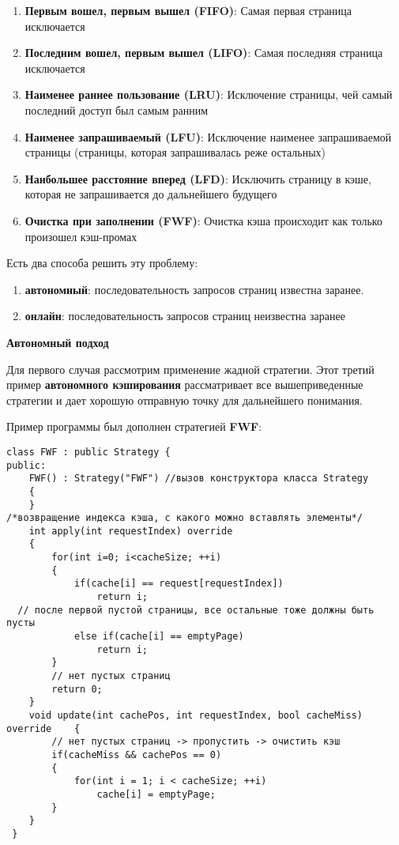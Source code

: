 \begin{enumerate}
    \item \textbf{Первым вошел, первым вышел (FIFO)}: Самая первая страница исключается
    \item \textbf{Последним вошел, первым вышел (LIFO)}: Самая последняя страница исключается
    \item \textbf{Наименее раннее пользование (LRU)}: Исключение страницы, чей самый последний доступ был самым ранним
    \item \textbf{Наименее запрашиваемый (LFU)}: Исключение наименее запрашиваемой страницы (страницы, которая запрашивалась реже остальных)
    \item \textbf{Наибольшее расстояние вперед (LFD)}: Исключить страницу в кэше, которая не запрашивается до дальнейшего будущего
    \item \textbf{Очистка при заполнении (FWF)}: Очистка кэша происходит как только произошел кэш-промах
\end{enumerate}

Есть два способа решить эту проблему:

\begin{enumerate}
    \item \textbf{автономный}: последовательность запросов страниц известна заранее.
    \item \textbf{онлайн}: последовательность запросов страниц неизвестна заранее
\end{enumerate}

\textbf{Автономный подход}

\vspace{\baselineskip}

Для первого случая рассмотрим применение жадной стратегии. Этот третий пример \textbf{автономного кэширования} рассматривает все вышеприведенные стратегии и дает хорошую отправную точку для дальнейшего понимания.

\vspace{\baselineskip}

Пример программы был дополнен стратегией \textbf{FWF}:

\begin{tcolorbox}
\begin{verbatim}
class FWF : public Strategy {
public:
    FWF() : Strategy("FWF") //вызов конструктора класса Strategy
    {
    }
/*возвращение индекса кэша, с какого можно вставлять элементы*/
    int apply(int requestIndex) override 
    {
        for(int i=0; i<cacheSize; ++i)
        {
            if(cache[i] == request[requestIndex])
                return i;
  // после первой пустой страницы, все остальные тоже должны быть пусты
            else if(cache[i] == emptyPage)
                return i;
        }
        // нет пустых страниц
        return 0;
    }
    void update(int cachePos, int requestIndex, bool cacheMiss) override    {
        // нет пустых страниц -> пропустить -> очистить кэш
        if(cacheMiss && cachePos == 0)
        {
            for(int i = 1; i < cacheSize; ++i)
                cache[i] = emptyPage;
        }
    }
 }

\end{verbatim}
\end{tcolorbox}

